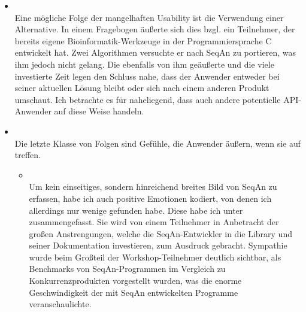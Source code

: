 \begin{itemize}
  \item[\codebullet{apiua://code/-9223372036854775216}] \textbf{} \\
  Eine mögliche Folge der mangelhaften Usability ist die Verwendung einer Alternative\label{sec:gt-seqan-alternative}. In einem Fragebogen äußerte sich dies bzgl. ein Teilnehmer, der bereits eigene Bioinformatik-Werkzeuge in der Programmiersprache C entwickelt hat. Zwei Algorithmen versuchte er nach SeqAn zu portieren, was ihm jedoch nicht gelang. Die ebenfalls von ihm geäußerte  und die viele investierte Zeit legen den Schluss nahe, dass der Anwender entweder bei seiner aktuellen Lösung bleibt oder sich nach einem anderen Produkt umschaut. Ich betrachte es für naheliegend, dass auch andere potentielle API-Anwender auf diese Weise handeln.
  
  \item[\codebullet{apiua://code/-9223372036854775441}] \textbf{} \\
  Die letzte Klasse von Folgen sind Gefühle, die Anwender äußern, wenn sie auf  treffen.
  
  \begin{itemize}
    \item[\codebullet{apiua://code/-9223372036854775447}] \textbf{} \\
    Um kein einseitiges, sondern hinreichend breites Bild von SeqAn zu erfassen, habe ich auch positive Emotionen kodiert, von denen ich allerdings nur wenige gefunden habe. Diese habe ich unter  zusammengefasst. Sie wird von einem Teilnehmer in Anbetracht der großen Anstrengungen, welche die SeqAn-Entwickler in die Library und seiner Dokumentation investieren, zum Ausdruck gebracht. Sympathie wurde beim Großteil der Workshop-Teilnehmer deutlich sichtbar, als Benchmarks von SeqAn-Programmen im Vergleich zu Konkurrenzprodukten vorgestellt wurden, was die enorme Geschwindigkeit der mit SeqAn entwickelten Programme veranschaulichte.
    

\end{itemize}
\end{itemize}
